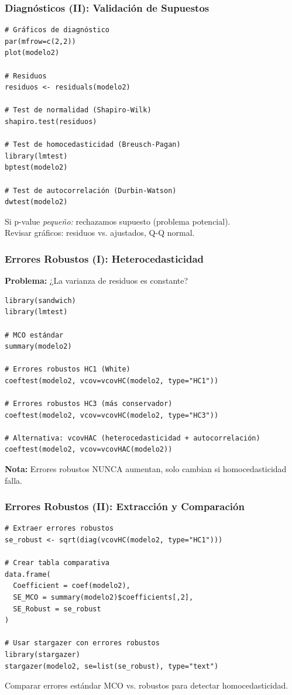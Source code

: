 \documentclass[aspectratio=169,11pt]{beamer}
\begin{document}
\begin{frame}[fragile]
  \frametitle{Diagnósticos (II): Validación de Supuestos}

  \begin{lstlisting}
# Gráficos de diagnóstico
par(mfrow=c(2,2))
plot(modelo2)

# Residuos
residuos <- residuals(modelo2)

# Test de normalidad (Shapiro-Wilk)
shapiro.test(residuos)

# Test de homocedasticidad (Breusch-Pagan)
library(lmtest)
bptest(modelo2)

# Test de autocorrelación (Durbin-Watson)
dwtest(modelo2)
  \end{lstlisting}

  \small
  Si p-value \textit{pequeño:} rechazamos supuesto (problema potencial).\\
  Revisar gráficos: residuos vs. ajustados, Q-Q normal.
\end{frame}

\begin{frame}[fragile]
  \frametitle{Errores Robustos (I): Heterocedasticidad}

  \textbf{Problema:} ¿La varianza de residuos es constante?

  \begin{lstlisting}
library(sandwich)
library(lmtest)

# MCO estándar
summary(modelo2)

# Errores robustos HC1 (White)
coeftest(modelo2, vcov=vcovHC(modelo2, type="HC1"))

# Errores robustos HC3 (más conservador)
coeftest(modelo2, vcov=vcovHC(modelo2, type="HC3"))

# Alternativa: vcovHAC (heterocedasticidad + autocorrelación)
coeftest(modelo2, vcov=vcovHAC(modelo2))
  \end{lstlisting}

  \small
  \textbf{Nota:} Errores robustos NUNCA aumentan, solo cambian si homocedasticidad falla.
\end{frame}

\begin{frame}[fragile]
  \frametitle{Errores Robustos (II): Extracción y Comparación}

  \begin{lstlisting}
# Extraer errores robustos
se_robust <- sqrt(diag(vcovHC(modelo2, type="HC1")))

# Crear tabla comparativa
data.frame(
  Coefficient = coef(modelo2),
  SE_MCO = summary(modelo2)$coefficients[,2],
  SE_Robust = se_robust
)

# Usar stargazer con errores robustos
library(stargazer)
stargazer(modelo2, se=list(se_robust), type="text")
  \end{lstlisting}

  \small
  Comparar errores estándar MCO vs. robustos para detectar homocedasticidad.
\end{frame}
\end{document}
